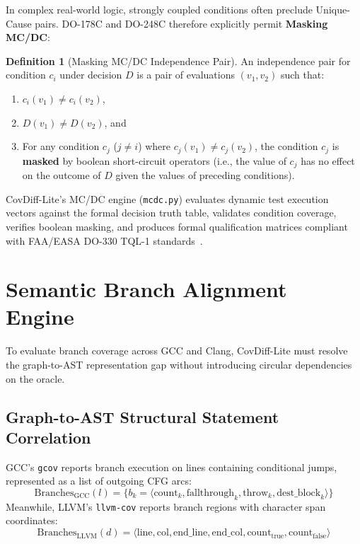 \documentclass[sigconf,review,anonymous=false]{acmart}
\theoremstyle{definition}
\newtheorem{definition}{Definition}
\begin{document}
In complex real-world logic, strongly coupled conditions often preclude Unique-Cause pairs. DO-178C and DO-248C therefore explicitly permit \textbf{Masking MC/DC}:

\begin{definition}[Masking MC/DC Independence Pair]
An independence pair for condition $c_i$ under decision $D$ is a pair of evaluations $(v_1, v_2)$ such that:
\begin{enumerate}
    \item $c_i(v_1) \neq c_i(v_2)$,
    \item $D(v_1) \neq D(v_2)$, and
    \item For any condition $c_j$ ($j \neq i$) where $c_j(v_1) \neq c_j(v_2)$, the condition $c_j$ is \textbf{masked} by boolean short-circuit operators (i.e., the value of $c_j$ has no effect on the outcome of $D$ given the values of preceding conditions).
\end{enumerate}
\end{definition}

CovDiff-Lite's MC/DC engine (\texttt{mcdc.py}) evaluates dynamic test execution vectors against the formal decision truth table, validates condition coverage, verifies boolean masking, and produces formal qualification matrices compliant with FAA/EASA DO-330 TQL-1 standards~\cite{rtca2011do330}.

\section{Semantic Branch Alignment Engine}

To evaluate branch coverage across GCC and Clang, CovDiff-Lite must resolve the graph-to-AST representation gap without introducing circular dependencies on the oracle.

\subsection{Graph-to-AST Structural Statement Correlation}
GCC's \texttt{gcov} reports branch execution on lines containing conditional jumps, represented as a list of outgoing CFG arcs:
\begin{equation}
\text{Branches}_{\text{GCC}}(l) = \{ b_k = \langle \text{count}_k, \text{fallthrough}_k, \text{throw}_k, \text{dest\_block}_k \rangle \}
\end{equation}
Meanwhile, LLVM's \texttt{llvm-cov} reports branch regions with character span coordinates:
\begin{equation}
\text{Branches}_{\text{LLVM}}(d) = \langle \text{line}, \text{col}, \text{end\_line}, \text{end\_col}, \text{count}_{\text{true}}, \text{count}_{\text{false}} \rangle
\end{equation}
\end{document}
